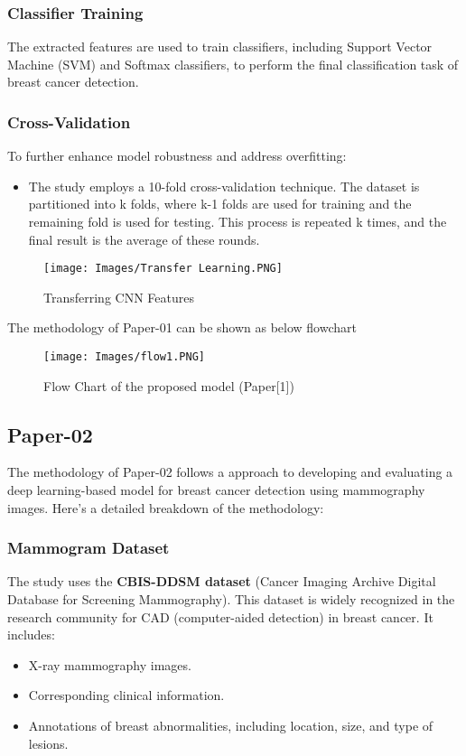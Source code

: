 \documentclass[12]{article}
\begin{document}
\subsubsection{Classifier Training}

The extracted features are used to train classifiers, including Support Vector Machine (SVM) and Softmax classifiers, to perform the final classification task of breast cancer detection.

\subsubsection{Cross-Validation}

To further enhance model robustness and address overfitting:
\begin{itemize}
    \item The study employs a 10-fold cross-validation technique. The dataset is partitioned into k folds, where k-1 folds are used for training and the remaining fold is used for testing. This process is repeated k times, and the final result is the average of these rounds.
\end{itemize}
\begin{figure}[hbt!]
    \centering
    \texttt{[image: Images/Transfer Learning.PNG]}
    \caption{Transferring CNN Features}
    \label{diagram1}
\end{figure}
The methodology of Paper-01 can be shown as below flowchart
\begin{figure}[hbt!]
    \centering
    \texttt{[image: Images/flow1.PNG]}
    \caption{Flow Chart of the proposed model (Paper[1])}
    \label{diagram2}
\end{figure}

\subsection{Paper-02}
The methodology of Paper-02 follows a approach to developing and evaluating a deep learning-based model for breast cancer detection using mammography images. Here's a detailed breakdown of the methodology:
\subsubsection{Mammogram Dataset}

The study uses the \textbf{CBIS-DDSM dataset} (Cancer Imaging Archive Digital Database for Screening Mammography). This dataset is widely recognized in the research community for CAD (computer-aided detection) in breast cancer. It includes:
\begin{itemize}
    \item X-ray mammography images.
    \item Corresponding clinical information.
    \item Annotations of breast abnormalities, including location, size, and type of lesions.
\end{itemize}
\end{document}
